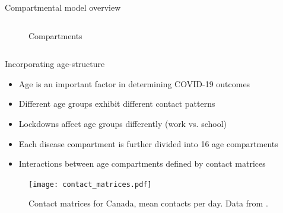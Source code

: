 \documentclass{beamer}
\begin{document}
\begin{frame}{Compartmental model overview}
\begin{columns}
\begin{column}{0.4\textwidth}
\begin{figure}
                \caption{Compartments}
            \end{figure}

        \end{column}

    \end{columns}
\end{frame}

\begin{frame}{Incorporating age-structure}

    \begin{itemize}
        \item Age is an important factor in determining COVID-19 outcomes
        \item Different age groups exhibit different contact patterns
        \item Lockdowns affect age groups differently (work vs. school)
        \item Each disease compartment is further divided into 16 age compartments
        \item Interactions between age compartments defined by contact matrices
    \end{itemize}

    \begin{figure}
        \texttt{[image: contact\_matrices.pdf]}
        \caption{Contact matrices for Canada, mean contacts per day. Data from \cite{prem2017projecting}.}
    \end{figure}
\end{frame}
\end{document}
